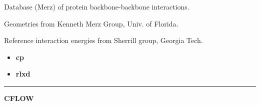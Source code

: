 \documentclass[letterpaper,10pt,english]{sphinxmanual}
\begin{document}
\begin{DUlineblock}{0em}
\item[] Database (Merz) of protein backbone-backbone interactions.
\item[] Geometries from Kenneth Merz Group, Univ. of Florida.
\item[] Reference interaction energies from Sherrill group, Georgia Tech.
\end{DUlineblock}
\begin{itemize}
\item {} 
\textbf{cp}   \textbar{}\textbar{} 

\item {} 
\textbf{rlxd} 

\end{itemize}


\bigskip\hrule{}\bigskip

\label{db:module-CFLOW}
\textbf{CFLOW}
\end{document}
